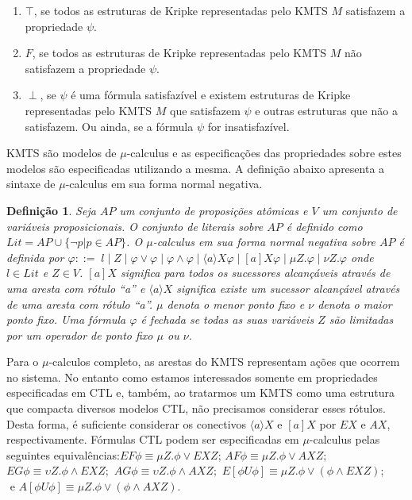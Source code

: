 \documentclass[normaltoc,capchap,capsec,times]{abnt}
\newtheorem{defi}{Definição}[section]
\begin{document}
\begin{enumerate}[label=(\arabic*),noitemsep]
	\item $\top$, se todos as estruturas de Kripke representadas pelo KMTS $M$ satisfazem a propriedade $\psi$.
	\item $F$, se todos as estruturas de Kripke representadas pelo KMTS $M$ não satisfazem a propriedade $\psi$.
	\item $\perp$, se $\psi$ é uma fórmula satisfazível e existem estruturas de Kripke representadas pelo KMTS $M$ que satisfazem $\psi$ e outras estruturas que não a satisfazem. Ou ainda, se a fórmula $\psi$ for insatisfazível.
\end{enumerate}


KMTS são modelos de $\mu$-calculus e as especificações das propriedades sobre estes modelos são especificadas utilizando a mesma. A definição abaixo apresenta a sintaxe de $\mu$-calculus em sua forma normal negativa. \cite{clarke} 

\begin{defi}
\textnormal{ \cite{clarke} Seja $AP$ um conjunto de proposições atômicas e $V$ um conjunto de variáveis proposicionais. O conjunto de literais sobre $AP$ é definido como $Lit = AP \cup \{ \neg p | p \in AP \}$. O $\mu$-calculus em sua forma normal negativa sobre $AP$ é definida por  $\varphi ::= \; l \; | \;  Z \; | \; \varphi \vee\varphi \; | \; \varphi \wedge \varphi \; | \; \langle a \rangle X \varphi \; | \; \left[ a \right] X \varphi \; | \; \mu Z.\varphi \; | \; \nu Z.\varphi $ onde  $l \in Lit$ e $Z \in V $. $[a]X$ significa para todos os sucessores alcançáveis através de uma aresta com rótulo ``a'' e $\langle a \rangle X$ significa existe um sucessor alcançável através de uma aresta com rótulo ``a''. $\mu$ denota o menor ponto fixo e  $\nu$ denota o maior ponto fixo. Uma fórmula $\varphi$ é fechada se todas as suas variáveis $Z$ são limitadas por um operador de ponto fixo $\mu$ ou $\nu$.
}
\end{defi}

Para o $\mu$-calculos completo, as arestas do KMTS representam ações que ocorrem no sistema. No entanto como estamos interessados somente em propriedades especificadas em CTL e, também, ao tratarmos um KMTS como uma estrutura que compacta diversos modelos CTL, não precisamos considerar esses rótulos. Desta forma, é suficiente considerar os conectivos $\langle a \rangle X$ e $[a]X$ por $EX$ e $AX$, respectivamente.
Fórmulas CTL podem ser especificadas em $\mu$-calculus pelas seguintes equivalências:$EF\phi \equiv \mu Z.\phi \vee EXZ$; $AF\phi \equiv \mu Z.\phi \vee AXZ$; $EG\phi \equiv \upsilon Z. \phi \wedge EXZ;$ $AG\phi \equiv \upsilon Z. \phi \wedge AXZ;$ $E[{\phi}U{\phi}] \equiv \mu Z.\phi \vee (\phi \wedge EXZ)$; $\mbox{ e } A[{\phi}U{\phi}] \equiv \mu Z.\phi \vee (\phi \wedge AXZ)$. \cite{clarke}
\end{document}
